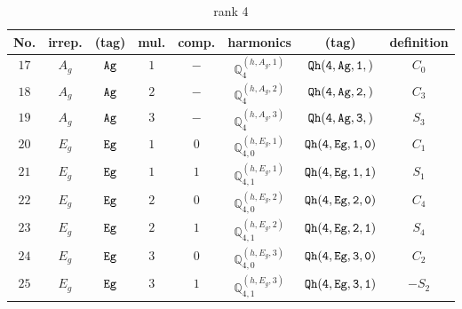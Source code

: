 \documentclass[fleqn,8pt]{jsarticle}
\begin{document}
\begin{table}[ht!]
\begin{center}
\caption{rank 4}
\renewcommand{\arraystretch}{1.3}
\begin{tabular}{cccccccc} \hline \hline
No. & irrep. & (tag) & mul. & comp. & harmonics & (tag) & definition \\ \hline
$ 17 $ & $ A_{g} $ & $ {\tt Ag} $ & $ 1 $ & $ - $ & $ \mathbb{Q}_{4}^{(h,A_{g},1)} $ & $ {\tt Qh(4,Ag,1,)} $ & $ C_{0} $ \\
$ 18 $ & $ A_{g} $ & $ {\tt Ag} $ & $ 2 $ & $ - $ & $ \mathbb{Q}_{4}^{(h,A_{g},2)} $ & $ {\tt Qh(4,Ag,2,)} $ & $ C_{3} $ \\
$ 19 $ & $ A_{g} $ & $ {\tt Ag} $ & $ 3 $ & $ - $ & $ \mathbb{Q}_{4}^{(h,A_{g},3)} $ & $ {\tt Qh(4,Ag,3,)} $ & $ S_{3} $ \\
$ 20 $ & $ E_{g} $ & $ {\tt Eg} $ & $ 1 $ & $ 0 $ & $ \mathbb{Q}_{4,0}^{(h,E_{g},1)} $ & $ {\tt Qh(4,Eg,1,0)} $ & $ C_{1} $ \\
$ 21 $ & $ E_{g} $ & $ {\tt Eg} $ & $ 1 $ & $ 1 $ & $ \mathbb{Q}_{4,1}^{(h,E_{g},1)} $ & $ {\tt Qh(4,Eg,1,1)} $ & $ S_{1} $ \\
$ 22 $ & $ E_{g} $ & $ {\tt Eg} $ & $ 2 $ & $ 0 $ & $ \mathbb{Q}_{4,0}^{(h,E_{g},2)} $ & $ {\tt Qh(4,Eg,2,0)} $ & $ C_{4} $ \\
$ 23 $ & $ E_{g} $ & $ {\tt Eg} $ & $ 2 $ & $ 1 $ & $ \mathbb{Q}_{4,1}^{(h,E_{g},2)} $ & $ {\tt Qh(4,Eg,2,1)} $ & $ S_{4} $ \\
$ 24 $ & $ E_{g} $ & $ {\tt Eg} $ & $ 3 $ & $ 0 $ & $ \mathbb{Q}_{4,0}^{(h,E_{g},3)} $ & $ {\tt Qh(4,Eg,3,0)} $ & $ C_{2} $ \\
$ 25 $ & $ E_{g} $ & $ {\tt Eg} $ & $ 3 $ & $ 1 $ & $ \mathbb{Q}_{4,1}^{(h,E_{g},3)} $ & $ {\tt Qh(4,Eg,3,1)} $ & $ - S_{2} $ \\
 \hline \hline
\end{tabular}
\end{center}
\end{table}
\end{document}
